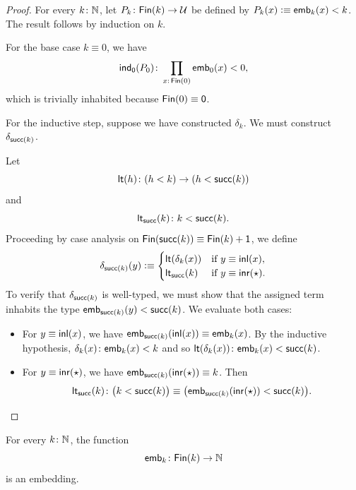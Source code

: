 \begin{proof}
    For every $k\colon\N$, let $P_k\colon\fun{Fin}(k)\to\univ$ be defined by $P_k(x)\mathrel{\vcentcolon}\equiv\mathsf{emb}_k(x)<k$. The result follows by induction on $k$.
    
    For the base case $k\equiv0$, we have
    \[
        \fun{ind}_{\fun0}(P_0)\colon
            \prod_{x\colon\fun{Fin}(0)}\fun{emb}_0(x)<0,
    \]
    which is trivially inhabited because $\mathsf{Fin}(0)\equiv\mathsf{0}$.
    
    For the inductive step, suppose we have constructed $\delta_k$. We must construct $\delta_{\mathsf{succ}(k)}$. 

    Let
    \[
        \fun{lt}(h)\colon(h<k)\to(h<\fun{succ}(k))
    \]
    and
    \[
        \fun{lt}_{\fun{succ}}(k)\colon k<\fun{succ}(k).
    \]
    Proceeding by case analysis on $\mathsf{Fin}(\mathsf{succ}(k))\equiv\mathsf{Fin}(k)+\mathsf{1}$, we define
    \[
        \delta_{\mathsf{succ}(k)}(y)
            \mathrel{\vcentcolon}\equiv\begin{cases}
                \mathsf{lt}(\delta_k(x))
                    &\text{if }y\equiv\mathsf{inl}(x),\\
                \mathsf{lt}_{\mathsf{succ}}(k)
                    &\text{if }y\equiv\mathsf{inr}({\mathsf{\star}}).
            \end{cases}
    \]
    To verify that $\delta_{\mathsf{succ}(k)}$ is well-typed, we must show that the assigned term inhabits the type $\mathsf{emb}_{\mathsf{succ}(k)}(y)<\mathsf{succ}(k)$. We evaluate both cases:
    \begin{itemize}
        \item For $y\equiv\mathsf{inl}(x)$, we have $\mathsf{emb}_{\mathsf{succ}(k)}(\mathsf{inl}(x))\equiv\mathsf{emb}_k(x)$. By the inductive hypothesis, $\delta_k(x)\colon\fun{emb}_k(x)<k$ and so $\fun{lt}(\delta_k(x))\colon\fun{emb}_k(x)<\fun{succ}(k)$.
        
        \item For $y\equiv\mathsf{inr}({\mathsf{\star}})$, we have $\mathsf{emb}_{\mathsf{succ}(k)}(\mathsf{inr}({\mathsf{\star}}))\equiv k$. Then
        \[
            \fun{lt}_{\fun{succ}}(k)\colon
                \bigl(k<\fun{succ}(k)\bigr)
                \equiv
                \bigl(
                    \fun{emb}_{\fun{succ}(k)}(
                        \fun{inr}(\fstar)
                    )
                    <\fun{succ}(k)
                \bigr).
        \]
    \end{itemize}
\end{proof}

\begin{prop}\label{prop:emb-is-an-embedding}
    For every\/ $k\colon\N$, the function
    \[
        \fun{emb}_k\colon\fun{Fin}(k)\to\N
    \]
    is an embedding.
\end{prop}

